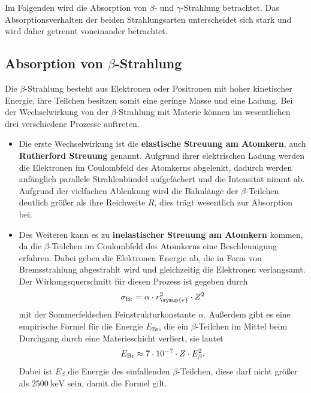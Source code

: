 Im Folgenden wird die Absorption von $\beta$- und $\gamma$-Strahlung betrachtet.
Das Absorptionsverhalten der beiden Strahlungsarten unterscheidet sich stark und wird daher getrennt voneinander betrachtet.

\subsection{\texorpdfstring{Absorption von $\beta$-Strahlung}{Absorption von Beta-Strahlung}}

Die $\beta$-Strahlung besteht aus Elektronen oder Positronen mit hoher kinetischer Energie, ihre Teilchen
besitzen somit eine geringe Masse und eine Ladung.
Bei der Wechselwirkung von der $\beta$-Strahlung mit Materie können im wesentlichen drei verschiedene Prozesse auftreten.
\begin{itemize}
    \item Die erste Wechselwirkung ist die \textbf{elastische Streuung am Atomkern}, auch \textbf{Rutherford Streuung} genannt.
    Aufgrund ihrer elektrischen Ladung werden die Elektronen im Coulombfeld des Atomkerns abgelenkt, dadurch werden anfänglich
    parallele Strahlenbündel aufgefächert und die Intensität nimmt ab. Aufgrund der vielfachen Ablenkung wird die Bahnlänge der
    $\beta$-Teilchen deutlich größer als ihre Reichweite $R$, dies trägt wesentlich zur Absorption bei.

    \item Des Weiteren kann es zu \textbf{inelastischer Streuung am Atomkern} kommen, da die $\beta$-Teilchen im Coulombfeld des
    Atomkerns eine Beschleunigung erfahren. Dabei geben die Elektronen Energie ab, die in Form von Bremsstrahlung
    abgestrahlt wird und gleichzeitig die Elektronen verlangsamt. Der Wirkungsquerschnitt für diesen Prozess ist gegeben durch
    \begin{equation}
        \sigma_{\text{Br}}=\alpha \cdot r_{\symup{e}}^2 \cdot Z^2
    \end{equation}
    mit der Sommerfeldschen Feinstrukturkonstante $\alpha$.
    Außerdem gibt es eine empirische Formel für die Energie $E_{\text{Br}}$, die ein $\beta$-Teilchen im Mittel beim
    Durchgang durch eine Materieschicht verliert, sie lautet
    \begin{equation}
        E_{\text{Br}} \approx 7\cdot 10^{-7} \cdot Z \cdot E_{\beta}^2. \notag
    \end{equation}
    Dabei ist $E_{\beta}$ die Energie des einfallenden $\beta$-Teilchen, diese darf nicht größer
    als $\qty{2500}{\kilo\electronvolt}$  sein, damit die Formel gilt.


\end{itemize}

